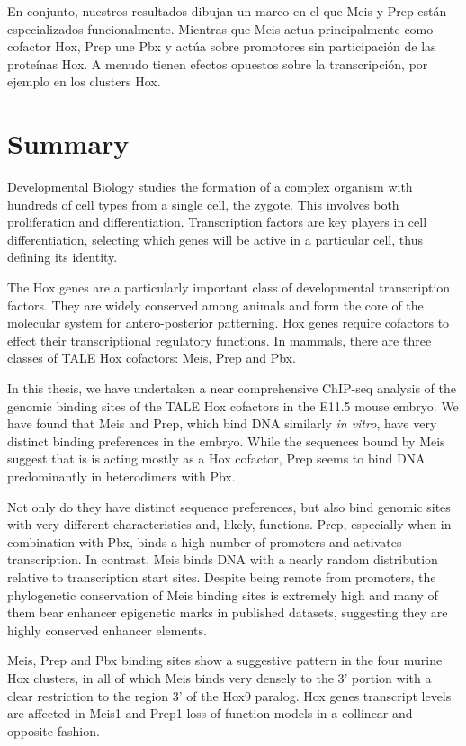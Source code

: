 En conjunto, nuestros resultados dibujan un marco en el que Meis y Prep están especializados funcionalmente. Mientras que Meis actua principalmente como cofactor Hox, Prep une Pbx y actúa sobre promotores sin participación de las proteínas Hox. A menudo tienen efectos opuestos sobre la transcripción, por ejemplo en los clusters Hox.






\chapter{Summary}

Developmental Biology studies the formation of a complex organism with hundreds of cell types from a single cell, the zygote. This involves both proliferation and differentiation. Transcription factors are key players in cell differentiation, selecting which genes will be active in a particular cell, thus defining its identity. 

The Hox genes are a particularly important class of developmental transcription factors. They are widely conserved among animals and form the core of the molecular system for antero-posterior patterning. Hox genes require cofactors to effect their transcriptional regulatory functions. In mammals, there are three classes of TALE Hox cofactors: Meis, Prep and Pbx. 

In this thesis, we have undertaken a near comprehensive ChIP-seq analysis of the genomic binding sites of the TALE Hox cofactors in the E11.5 mouse embryo. We have found that Meis and Prep, which bind DNA similarly \textit{in vitro}, have very distinct binding preferences in the embryo. While the sequences bound by Meis suggest that is is acting mostly as a Hox cofactor, Prep seems to bind DNA predominantly in heterodimers with Pbx. 

Not only do they have distinct sequence preferences, but also bind genomic sites with very different characteristics and, likely, functions. Prep, especially when in combination with Pbx, binds a high number of promoters and activates transcription. In contrast, Meis binds DNA with a nearly random distribution relative to transcription start sites. Despite being remote from promoters, the phylogenetic conservation of Meis binding sites is extremely high and many of them bear enhancer epigenetic marks in published datasets, suggesting they are highly conserved enhancer elements. 

Meis, Prep and Pbx binding sites show a suggestive pattern in the four murine Hox clusters, in all of which Meis binds very densely to the 3' portion with a clear restriction to the region 3' of the Hox9 paralog. Hox genes transcript levels are affected in Meis1 and Prep1 loss-of-function models in a collinear and opposite fashion. 

